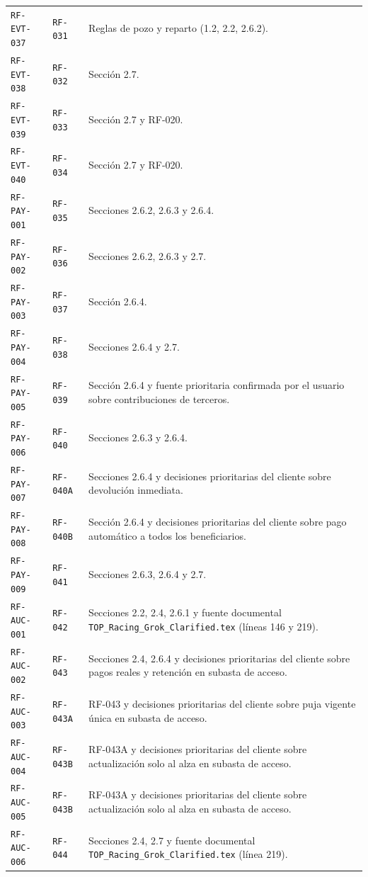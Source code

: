 \documentclass[10pt,letterpaper]{article}
\begin{document}
\begin{landscape}
\begin{longtable}{P{2.7cm}P{2.6cm}P{15.7cm}}
\texttt{RF-EVT-037} & \texttt{RF-031} & Reglas de pozo y reparto (1.2, 2.2, 2.6.2).\\
\texttt{RF-EVT-038} & \texttt{RF-032} & Sección 2.7.\\
\texttt{RF-EVT-039} & \texttt{RF-033} & Sección 2.7 y RF-020.\\
\texttt{RF-EVT-040} & \texttt{RF-034} & Sección 2.7 y RF-020.\\
\texttt{RF-PAY-001} & \texttt{RF-035} & Secciones 2.6.2, 2.6.3 y 2.6.4.\\
\texttt{RF-PAY-002} & \texttt{RF-036} & Secciones 2.6.2, 2.6.3 y 2.7.\\
\texttt{RF-PAY-003} & \texttt{RF-037} & Sección 2.6.4.\\
\texttt{RF-PAY-004} & \texttt{RF-038} & Secciones 2.6.4 y 2.7.\\
\texttt{RF-PAY-005} & \texttt{RF-039} & Sección 2.6.4 y fuente prioritaria confirmada por el usuario sobre contribuciones de terceros.\\
\texttt{RF-PAY-006} & \texttt{RF-040} & Secciones 2.6.3 y 2.6.4.\\
\texttt{RF-PAY-007} & \texttt{RF-040A} & Secciones 2.6.4 y decisiones prioritarias del cliente sobre devolución inmediata.\\
\texttt{RF-PAY-008} & \texttt{RF-040B} & Sección 2.6.4 y decisiones prioritarias del cliente sobre pago automático a todos los beneficiarios.\\
\texttt{RF-PAY-009} & \texttt{RF-041} & Secciones 2.6.3, 2.6.4 y 2.7.\\
\texttt{RF-AUC-001} & \texttt{RF-042} & Secciones 2.2, 2.4, 2.6.1 y fuente documental \texttt{TOP\_Racing\_Grok\_Clarified.tex} (líneas 146 y 219).\\
\texttt{RF-AUC-002} & \texttt{RF-043} & Secciones 2.4, 2.6.4 y decisiones prioritarias del cliente sobre pagos reales y retención en subasta de acceso.\\
\texttt{RF-AUC-003} & \texttt{RF-043A} & RF-043 y decisiones prioritarias del cliente sobre puja vigente única en subasta de acceso.\\
\texttt{RF-AUC-004} & \texttt{RF-043B} & RF-043A y decisiones prioritarias del cliente sobre actualización solo al alza en subasta de acceso.\\
\texttt{RF-AUC-005} & \texttt{RF-043B} & RF-043A y decisiones prioritarias del cliente sobre actualización solo al alza en subasta de acceso.\\
\texttt{RF-AUC-006} & \texttt{RF-044} & Secciones 2.4, 2.7 y fuente documental \texttt{TOP\_Racing\_Grok\_Clarified.tex} (línea 219).\\

\end{longtable}
\end{landscape}
\end{document}
